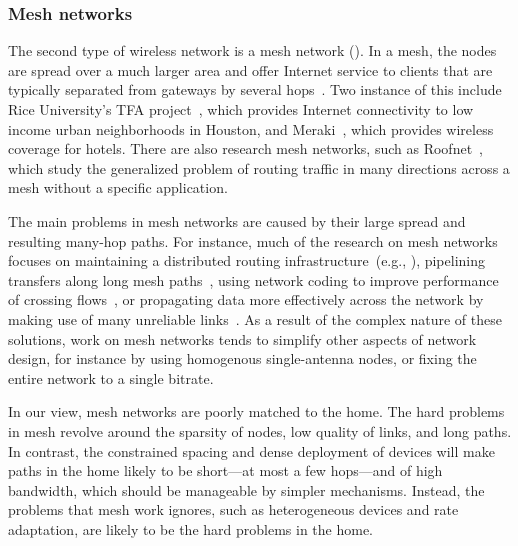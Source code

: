\subsubsection{Mesh networks}
The second type of wireless network is a mesh network (). In a mesh, the nodes are spread over a much larger area and offer Internet service to clients that are typically separated from gateways by several hops~\cite{whitehead_mesh}. Two instance of this include Rice University's TFA project~\cite{camp_tfa,rice_tfa}, which provides Internet connectivity to low income urban neighborhoods in Houston, and Meraki~\cite{meraki}, which provides wireless coverage for hotels. There are also research mesh networks, such as Roofnet~\cite{bicket_roofnet}, which study the generalized problem of routing traffic in many directions across a mesh without a specific application.

The main problems in mesh networks are caused by their large spread and resulting many-hop paths. For instance, much of the research on mesh networks focuses on maintaining a distributed routing infrastructure~(e.g., \cite{draves_ett,rozner_soar}), pipelining transfers along long mesh paths~\cite{li_blockswitched,li_mesh,rodrig_thesis}, using network coding to improve performance of crossing flows~\cite{katti_xors,katti_anc}, or propagating data more effectively across the network by making use of many unreliable links~\cite{biswas_exor}. As a result of the complex nature of these solutions, work on mesh networks tends to simplify other aspects of network design, for instance by using homogenous single-antenna nodes, or fixing the entire network to a single bitrate.

 In our view, mesh networks are poorly matched to the home. The hard problems in mesh revolve around the sparsity of nodes, low quality of links, and long paths. In contrast, the constrained spacing and dense deployment of devices will make paths in the home likely to be short---at most a few hops---and of high bandwidth, which should be manageable by simpler mechanisms. Instead, the problems that mesh work ignores, such as heterogeneous devices and rate adaptation, are likely to be the hard problems in the home.
 
